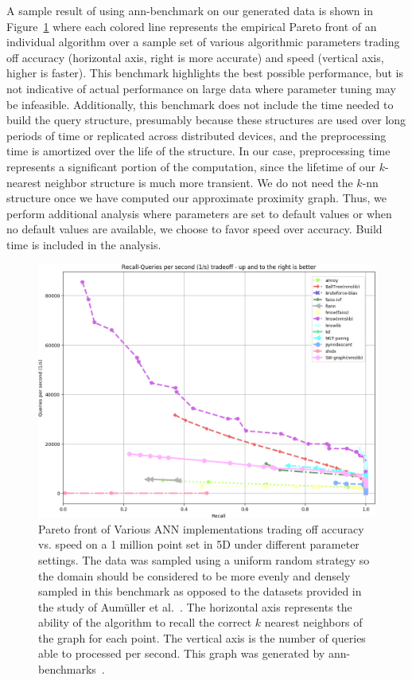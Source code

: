 A sample result of using ann-benchmark on our generated data is shown in Figure~\ref{fig:pareto} where each colored line represents the empirical Pareto front of an individual algorithm over a sample set of various algorithmic parameters trading off accuracy (horizontal axis, right is more accurate) and speed (vertical axis, higher is faster).
%
This benchmark highlights the best possible performance, but is not indicative of actual performance on large data where parameter tuning may be infeasible.
%
Additionally, this benchmark does not include the time needed to build the query structure, presumably because these structures are used over long periods of time or replicated across distributed devices, and the preprocessing time is amortized over the life of the structure.
%
In our case, preprocessing time represents a significant portion of the computation, since the lifetime of our $k$-nearest neighbor structure is much more transient.
%
We do not need the $k$-nn structure once we have computed our approximate proximity graph.
%
Thus, we perform additional analysis where parameters are set to default values or when no default values are available, we choose to favor speed over accuracy.  
%
Build time is included in the analysis.

\begin{figure}[t]
    \centering
      \includegraphics[width=.95\linewidth]{figs/chap7/uniform-5-euclidean.png}
     \caption[Example performance plot generated by ann-benchmarks]{Pareto front of Various ANN implementations trading off accuracy vs.
       speed on a 1 million point set in 5D under different parameter settings.
       The data was sampled using a uniform random strategy so the domain should be
       considered to be more evenly and densely sampled in this benchmark as
       opposed to the datasets provided in the study of Aum{\"{u}}ller et
       al.~\cite{AumullerBernhardssonFaithfull2018}.
       The horizontal axis represents the ability of the algorithm to recall the
       correct $k$ nearest neighbors of the graph for each point.
       The vertical axis is the number of queries able to  processed per second.
       This graph was generated by ann-benchmarks~\cite{ANNBenchmark}.
     }
    \label{fig:pareto}
\end{figure}

